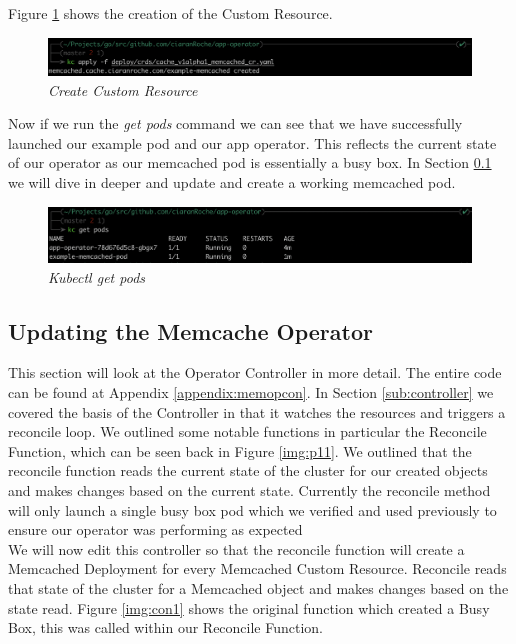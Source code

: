 Figure \ref{img:op06} shows the creation of the Custom Resource.
\begin{figure}[!ht]
\centering
\includegraphics*[width=1\textwidth]{images/op06.png}
\caption{\em Create Custom Resource }
\label{img:op06}
\end{figure}
\newpage
Now if we run the \textit{get pods} command we can see that we have successfully launched our example pod and our app operator. This reflects the current state of our operator as our memcached pod is essentially a busy box. In Section \ref{sub:updateMem} we will dive in deeper and update and create a working memcached pod.
\begin{figure}[!ht]
\centering
\includegraphics*[width=1\textwidth]{images/op07.png}
\caption{\em Kubectl get pods}
\label{img:op07}
\end{figure}

\subsection{Updating the Memcache Operator}
\label{sub:updateMem}
This section will look at the Operator Controller in more detail. The entire code can be found at Appendix \ref{appendix:memopcon}. In Section \ref{sub:controller} we covered the basis of the Controller in that it watches the resources and triggers a reconcile loop. We outlined some notable functions in particular the Reconcile Function, which can be seen back in Figure \ref{img:p11}. We outlined that the reconcile function reads the current state of the cluster for our created objects and makes changes based on the current state. Currently the reconcile method will only launch a single busy box pod which we verified and used previously to ensure our operator was performing as expected
\\ We will now edit this controller so that the reconcile function will create a Memcached Deployment for every Memcached Custom Resource.
Reconcile reads that state of the cluster for a Memcached object and makes changes based on the state read.
\newpage Figure \ref{img:con1} shows the original function which created a Busy Box, this was called within our Reconcile Function.

